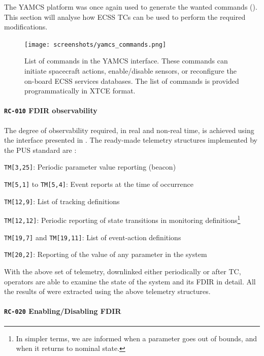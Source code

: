 \documentclass[a4paper,nobib,final]{tufte-book}
\begin{document}
The \ac{YAMCS} platform was once again used to generate the wanted commands (). This section will analyse how \acs{ECSS} \acsp{TC} can be used to perform the required modifications.

\begin{figure}[h]
	\texttt{[image: screenshots/yamcs\_commands.png]}
	\caption[List of commands in the YAMCS interface]{List of commands in the \acs{YAMCS} interface. These commands can initiate spacecraft actions, enable/disable sensors, or reconfigure the on-board \acs{ECSS} services databases. The list of commands is provided programmatically in \ac{XTCE} format.}
	\label{fig:yamcs_commands}
\end{figure}


\paragraph{\textbf{\texttt{RC-010} \acs{FDIR} observability}}
The degree of observability required, in real and non-real time, is achieved using the interface presented in . The ready-made telemetry structures implemented by the \acs{PUS} standard are \autocite{ECSS-E-ST-70-41C}:
\begin{compactitem}
	\item \texttt{TM[3,25]}: Periodic parameter value reporting (beacon)
	\item \texttt{TM[5,1]} to \texttt{TM[5,4]}: Event reports at the time of occurrence
	\item \texttt{TM[12,9]}: List of tracking definitions
	\item \texttt{TM[12,12]}: Periodic reporting of state transitions in monitoring definitions\footnote{In simpler terms, we are informed when a parameter goes out of bounds, and when it returns to nominal state.}
	\item \texttt{TM[19,7]} and \texttt{TM[19,11]}: List of event-action definitions
	\item \texttt{TM[20,2]}: Reporting of the value of any parameter in the system
\end{compactitem}

With the above set of telemetry, downlinked either periodically or after \acs{TC}, operators are able to examine the state of the system and its \acs{FDIR} in detail. All the results of  were extracted using the above telemetry structures.

\paragraph{\textbf{\texttt{RC-020} Enabling/Disabling \acs{FDIR}}}
\end{document}
